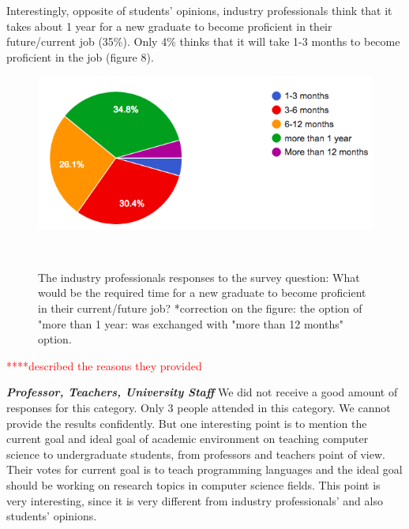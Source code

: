 \documentclass{sigchi}
\begin{document}
Interestingly, opposite of students' opinions, industry professionals think that it takes about 1 year for a new graduate to become proficient in their future/current job (35\%). Only 4\% thinks that it will take 1-3 months to become proficient in the job (figure 8).

\begin{figure}
\centering
  \includegraphics[width=1.05\columnwidth]{figures/time_proficiency_i}
  \caption{The industry professionals responses to the survey question: What would be the required time for a new graduate to become proficient in their current/future job? *correction on the figure: the option of "more than 1 year: was exchanged with "more than 12 months" option.}~\label{fig:figure8}
\end{figure}


\textcolor{red}{****described the reasons they provided}


\textit{\textbf{Professor, Teachers, University Staff}}\newline
We did not receive a good amount of responses for this category. Only 3 people attended in this category. We cannot provide the results confidently. But one interesting point is to mention the current goal and ideal goal of academic environment on teaching computer science to undergraduate students, from professors and teachers point of view. Their votes for current goal is to teach programming languages and the ideal goal should be working on research topics in computer science fields. This point is very interesting, since it is very different from industry professionals' and also students' opinions.
\end{document}
